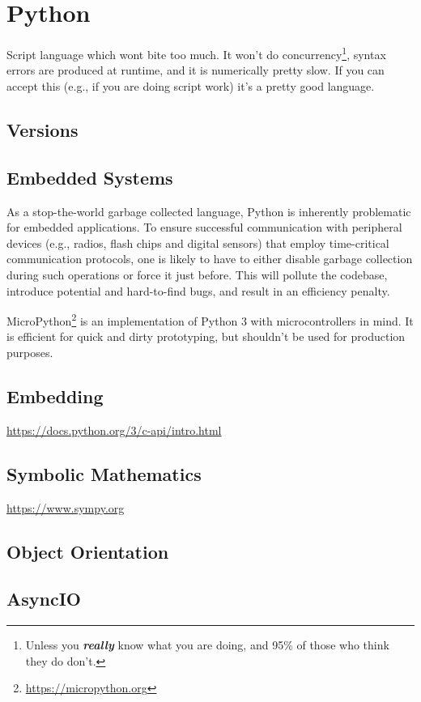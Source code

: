 \section{Python}

Script language which wont bite too much. It won't do concurrency\footnote{Unless you \textsl{\textbf{really}} know what you are doing, and 95\% of those who think they do don't.}, syntax errors are produced at runtime, and it is numerically pretty slow. If you can accept this (e.g., if you are doing script work) it's a pretty good language.

\subsection{Versions}

\subsection{Embedded Systems}

As a stop-the-world garbage collected language, Python is inherently problematic for embedded applications. To ensure successful communication with peripheral devices (e.g., radios, flash chips and digital sensors) that employ time-critical communication protocols, one is likely to have to either disable garbage collection during such operations or force it just before. This will pollute the codebase, introduce potential and hard-to-find bugs, and result in an efficiency penalty.

MicroPython\footnote{\url{https://micropython.org}} is an implementation of Python 3 with microcontrollers in mind. It is efficient for quick and dirty prototyping, but shouldn't be used for production purposes.

\subsection{Embedding}

\url{https://docs.python.org/3/c-api/intro.html}

\subsection{Symbolic Mathematics}

\url{https://www.sympy.org}

\subsection{Object Orientation}

\subsection{AsyncIO}

